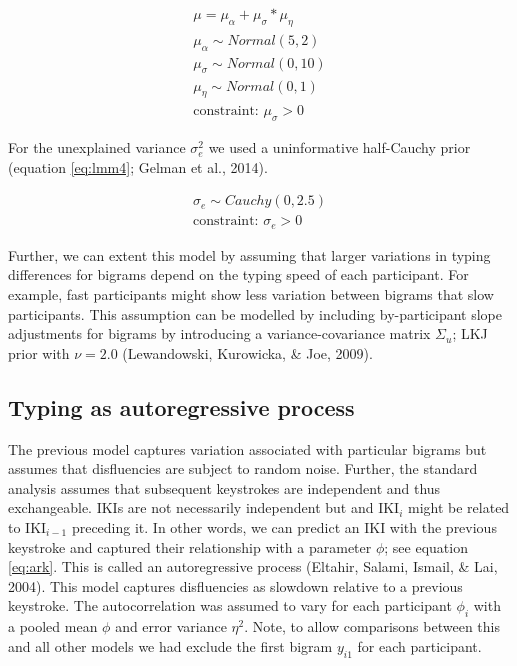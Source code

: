 \documentclass[english,man,floatsintext]{apa7}
\begin{document}
\[
\tag{4}
\begin{aligned}
\mu = \mu_{\alpha} + \mu_{\sigma} * \mu_{\eta}\\
\mu_{\alpha} \sim Normal(5,2)\\
\mu_{\sigma} \sim Normal(0,10)\\
\mu_{\eta} \sim Normal(0,1)\\
\text{constraint: }\mu_{\sigma}>0 
\end{aligned}
\label{eq:lmm3}
\]

For the unexplained variance \(\sigma_e^2\) we used a uninformative half-Cauchy prior (equation \ref{eq:lmm4}; Gelman et al., 2014).

\[
\tag{5}
\begin{aligned}
\sigma_e \sim Cauchy(0,2.5)\\
\text{constraint: }\sigma_e>0 
\end{aligned}
\label{eq:lmm4}
\]

Further, we can extent this model by assuming that larger variations in typing differences for bigrams depend on the typing speed of each participant. For example, fast participants might show less variation between bigrams that slow participants. This assumption can be modelled by including by-participant slope adjustments for bigrams by introducing a variance-covariance matrix \(\Sigma_u\); LKJ prior with \(\nu=2.0\) (Lewandowski, Kurowicka, \& Joe, 2009).

\hypertarget{typing-as-autoregressive-process}{%
\subsection{Typing as autoregressive process}\label{typing-as-autoregressive-process}}

The previous model captures variation associated with particular bigrams but assumes that disfluencies are subject to random noise. Further, the standard analysis assumes that subsequent keystrokes are independent and thus exchangeable. IKIs are not necessarily independent but and IKI\(_{i}\) might be related to IKI\(_{i-1}\) preceding it. In other words, we can predict an IKI with the previous keystroke and captured their relationship with a parameter \(\phi\); see equation \ref{eq:ark}. This is called an autoregressive process (Eltahir, Salami, Ismail, \& Lai, 2004). This model captures disfluencies as slowdown relative to a previous keystroke. The autocorrelation was assumed to vary for each participant \(\phi_i\) with a pooled mean \(\phi\) and error variance \(\eta^2\). Note, to allow comparisons between this and all other models we had exclude the first bigram \(y_{i1}\) for each participant.
\end{document}
